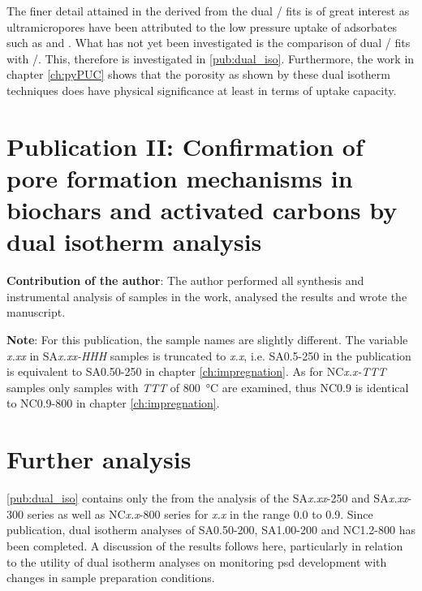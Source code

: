 The finer detail attained in the derived  from the dual / fits is of great interest as \glspl{ultramicropore} have been attributed to the low pressure uptake of \glspl{adsorbate} such as  and .\citep{Presser2011Effect, Sevilla2014Energy, Cabria2007optimum, DelaCasaLillo2002Hydrogen, Masika2012Hydrogen} What has not yet been investigated is the comparison of dual / fits with /. This, therefore is investigated in \ref{pub:dual_iso}. Furthermore, the work in chapter \ref{ch:pyPUC} shows that the porosity as shown by these dual isotherm techniques does have physical significance at least in terms of  uptake capacity.
%
\newpage
\section[Publication II]{Publication II: Confirmation of pore formation mechanisms in biochars and activated carbons by dual isotherm analysis}

\textbf{Contribution of the author}: The author performed all synthesis and instrumental analysis of samples in the work, analysed the results and wrote the manuscript.

\textbf{Note}: For this publication, the sample names are slightly different. The variable \textit{x.xx} in SA\textit{x.xx-HHH} samples is truncated to \textit{x.x}, i.e. SA0.5-250 in the publication is equivalent to SA0.50-250 in chapter \ref{ch:impregnation}. As for NC\textit{x.x-TTT} samples only samples with \textit{TTT} of \qty{800}{\degreeCelsius} are examined, thus NC0.9 is identical to NC0.9-800 in chapter \ref{ch:impregnation}.  

\setcounter{opagenum}{\thepage}
\newpage

\setlength{\originalVOffset}{\voffset}   
\setlength{\originalHOffset}{\hoffset}

\setlength{\voffset}{0cm}
\setlength{\hoffset}{0cm}

\setlength{\voffset}{\originalVOffset}
\setlength{\hoffset}{\originalHOffset}

\newpage
\section{Further analysis}
\ref{pub:dual_iso} contains only the  from the analysis of the SA\textit{x.xx}-250 and SA\textit{x.xx}-300 series as well as NC\textit{x.x}-800 series for \textit{x.x} in the range 0.0 to 0.9. Since publication, dual isotherm analyses of SA0.50-200, SA1.00-200 and NC1.2-800 has been completed. A discussion of the results follows here, particularly in relation to the utility of dual isotherm analyses on monitoring \acrshort{psd} development with changes in sample preparation conditions.

